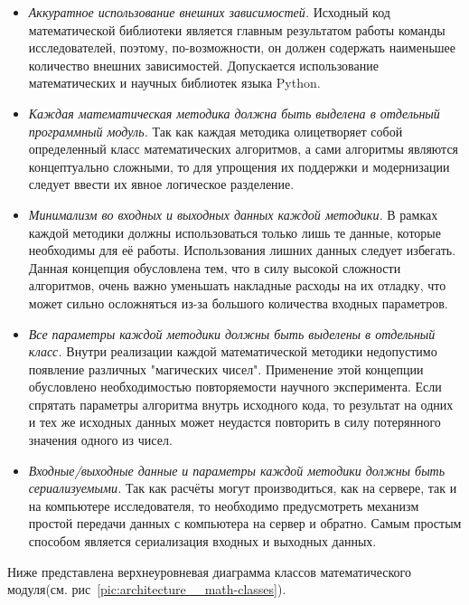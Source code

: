 \begin{itemize}
    \item {
        \textit{Аккуратное использование внешних зависимостей.}
        Исходный код математической библиотеки является главным результатом работы команды исследователей,
        поэтому, по-возможности, он должен содержать наименьшее количество внешних зависимостей.
        Допускается использование математических и научных библиотек языка Python.
    }
    \item {
        \textit{Каждая математическая методика должна быть выделена в отдельный программный модуль.}
        Так как каждая методика олицетворяет собой определенный класс математических алгоритмов,
        а сами алгоритмы являются концептуально сложными, то для упрощения их поддержки и модернизации
        следует ввести их явное логическое разделение.
    }
    \item {
        \textit{Минимализм во входных и выходных данных каждой методики.}
        В рамках каждой методики должны использоваться только лишь те данные, которые необходимы для её работы.
        Использования лишних данных следует избегать.
        Данная концепция обусловлена тем, что в силу высокой сложности алгоритмов,
        очень важно уменьшать накладные расходы на их отладку, что может сильно осложняться
        из-за большого количества входных параметров.
    }
    \item {
        \textit{Все параметры каждой методики должны быть выделены в отдельный класс.}
        Внутри реализации каждой математической методики недопустимо появление различных "магических чисел".
        Применение этой концепции обусловлено необходимостью повторяемости научного эксперимента.
        Если спрятать параметры алгоритма внутрь исходного кода, то результат на одних и тех же исходных данных
        может неудастся повторить в силу потерянного значения одного из чисел.
    }
    \item {
        \textit{Входные/выходные данные и параметры каждой методики должны быть сериализуемыми.}
        Так как расчёты могут производиться, как на сервере, так и на компьютере исследователя, то необходимо
        предусмотреть механизм простой передачи данных с компьютера на сервер и обратно. Самым простым способом
        является сериализация входных и выходных данных.
    }
\end{itemize}

Ниже представлена верхнеуровневая диаграмма классов математического
модуля(см. рис\ \ref{pic:architecture__math-classes}).

